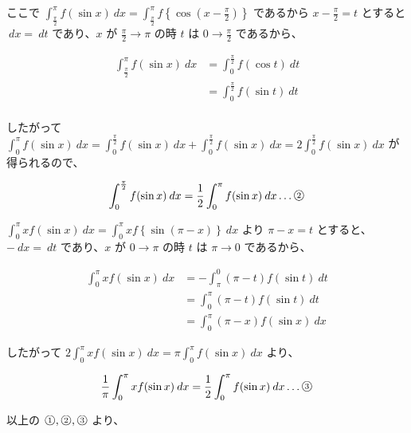 \documentclass[a4j]{jsarticle}
\newcommand{\ctext}[1]{\raise0.2ex\hbox{\textcircled{\scriptsize{#1}}}} %
\begin{document}
    ここで $\displaystyle \int_{\frac{\pi}{2}}^{\pi} f(\sin x)  \: dx = \int_{\frac{\pi}{2}}^{\pi} f \left\{ \cos\left(x - \frac{\pi}{2}\right) \right\}$ であるから $\displaystyle x - \frac{\pi}{2} = t$ とすると
    $\displaystyle  \: dx = \: dt$ であり、$\displaystyle x$ が $\displaystyle \frac{\pi}{2} \rightarrow \pi$ の時 $\displaystyle t$ は $\displaystyle 0 \rightarrow \frac{\pi}{2}$ であるから、

    \begin{align*}
        \int_{\frac{\pi}{2}}^{\pi} f(\sin x) \: dx &= \int_{0}^{\frac{\pi}{2}} f(\cos t)\: dt \\
        &= \int_{0}^{\frac{\pi}{2}} f(\sin t) \: dt \\
    \end{align*}

    したがって $ \displaystyle \int_{0}^{\pi} f(\sin x) \: dx = \int_{0}^{\frac{\pi}{2}} f(\sin x) \: dx + \int_{0}^{\frac{\pi}{2}} f(\sin x) \: dx = 2 \int_{0}^{\frac{\pi}{2}} f(\sin x) \: dx $ が得られるので、

    \begin{equation*}
        \int_{0}^{\frac{\pi}{2}} f(\sin x) \: dx = \frac{1}{2} \int_{0}^{\pi} f(\sin x) \: dx \dots \ctext{2}
    \end{equation*}

    $\displaystyle \int_{0}^{\pi} x f(\sin x) \: dx = \int_{0}^{\pi} xf\left\{ \sin \left(\pi - x \right) \right\}  \: dx$ より $\displaystyle \pi - x = t$ とすると、
    $\displaystyle - \: dx = \: dt$ であり、$\displaystyle x$ が $\displaystyle 0 \rightarrow \pi$ の時 $\displaystyle t$ は $\displaystyle \pi \rightarrow 0$ であるから、

    \begin{align*}
        \int_{0}^{\pi} xf(\sin x) \: dx &= -\int_{\pi}^{0} (\pi - t)f(\sin t)\: dt \\
        &= \int_{0}^{\pi} (\pi - t)f(\sin t)\: dt \\
        &= \int_{0}^{\pi} (\pi - x)f(\sin x) \: dx
    \end{align*}

    したがって $\displaystyle 2\int_{0}^{\pi} xf(\sin x) \: dx = \pi \int_{0}^{\pi} f(\sin x) \: dx$ より、

    \begin{equation*}
        \frac{1}{\pi} \int_{0}^{\pi} xf( \sin x)  \: dx = \frac{1}{2} \int_{0}^{\pi} f(\sin x)  \: dx \dots \ctext{3}
    \end{equation*}

    以上の $\ctext{1}, \ctext{2}, \ctext{3}$ より、
\end{document}
